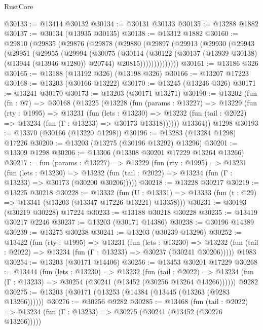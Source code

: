 \begin{lexlean}{RustCore}
\begin{coremodule}
@30133 := @13414 @30132
@30134 := @30131 @30133
@30135 := @13288 @1882
@30137 := @30134 (@13935 @30135)
@30138 := @13312 @1882
@30160 := @29810
    (@29835
      (@29876
        (@29878
          (@29880
            (@29897
              (@29913
                (@29930
                  (@29943
                    (@29951
                      (@29955
                        (@29994
                          (@30075
                            (@30114
                              (@30122
                                (@30137 (@13939 @30138) (@13944 (@13946 @1280)) @20744)
                                @20815))))))))))))))
@30161 := @13186 @326
@30165 := @13188 (@13192 @326) (@13198 @326)
@30166 := @13207 @17223
@30168 := @13203 (@30166 @13222)
@30170 := @13245 (@13246 @326)
@30171 := @13241 @30170
@30173 := @13203 (@30171 @13271)
@30190 := @13202
    (fun (fn : @7) =>
    @30168
      (@13225
        (@13228
          (fun (params : @13227) =>
          @13229
            (fun (rty : @1995) =>
            @13231
              (fun (lets : @13230) =>
              @13232 (fun (tail : @2022) => @13234 (fun (Γ : @13233) => @30173 @13318))))))
        @13364))
    @1298
@30193 := @13370 (@30166 (@13220 @1298))
@30196 := @13283 (@13284 @1298) @17226
@30200 := @13203 (@13275 (@30196 @13292) @13296)
@30201 := @13309 @1298
@30206 := @13306 (@13308 @30201 @17229 @13264 @13266)
@30217 := fun (params : @13227) =>
  @13229
    (fun (rty : @1995) =>
    @13231
      (fun (lets : @13230) =>
      @13232 (fun (tail : @2022) => @13234 (fun (Γ : @13233) => @30173 (@30200 @30206)))))
@30218 := @13228 @30217
@30219 := @13225 @30218
@30228 := @13332
    (fun (U : @13331) => @13333 (fun (t : @29) => @13341 (@13203 (@13347 @17226 @13221) @13358)))
@30231 := @30193 (@30219 @30228) @17224
@30233 := @13188 @30218 @30228
@30235 := @13419 @30217 @2246
@30237 := @13203 (@30171 @14386)
@30238 := @30196 @14389
@30239 := @13275 @30238
@30241 := @13203 (@30239 @13296)
@30252 := @13422
    (fun (rty : @1995) =>
    @13231
      (fun (lets : @13230) =>
      @13232 (fun (tail : @2022) => @13234 (fun (Γ : @13233) => @30237 (@30241 @30206)))))
    @1983
@30254 := @13203 (@30171 @14406)
@30256 := @13453 @30201 @17229
@30268 := @13444
    (fun (lets : @13230) =>
    @13232
      (fun (tail : @2022) =>
      @13234 (fun (Γ : @13233) => @30254 (@30241 (@13452 (@30256 @13264 @13266))))))
    @9282
@30275 := @13203 (@30171 (@13253 (@14384 (@13445 (@13263 (@9283 @13266))))))
@30276 := @30256 @9282
@30285 := @13468
    (fun (tail : @2022) => @13234 (fun (Γ : @13233) => @30275 (@30241 (@13452 (@30276 @13266)))))

\end{coremodule}
\end{lexlean}
